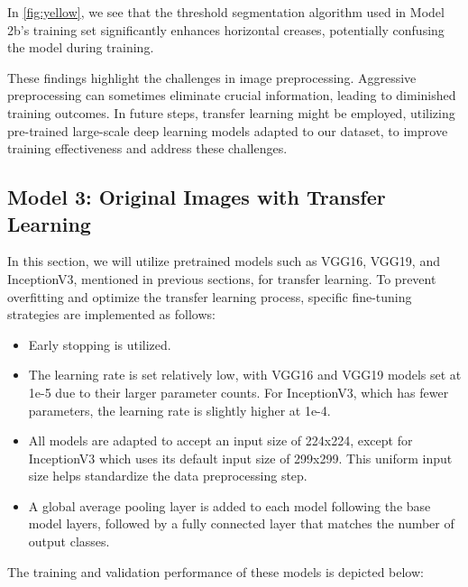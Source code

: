 In \autoref{fig:yellow}, we see that the threshold segmentation algorithm used in Model 2b’s training set significantly enhances horizontal creases, potentially confusing the model during training.

These findings highlight the challenges in image preprocessing. Aggressive preprocessing can sometimes eliminate crucial information, leading to diminished training outcomes. In future steps, transfer learning might be employed, utilizing pre-trained large-scale deep learning models adapted to our dataset, to improve training effectiveness and address these challenges.


\subsection{Model 3: Original Images with Transfer Learning}

In this section, we will utilize pretrained models such as VGG16, VGG19, and InceptionV3, mentioned in previous sections, for transfer learning. To prevent overfitting and optimize the transfer learning process, specific fine-tuning strategies are implemented as follows:

\begin{itemize}
    \item Early stopping is utilized.
    \item The learning rate is set relatively low, with VGG16 and VGG19 models set at 1e-5 due to their larger parameter counts. For InceptionV3, which has fewer parameters, the learning rate is slightly higher at 1e-4.
    \item All models are adapted to accept an input size of 224x224, except for InceptionV3 which uses its default input size of 299x299. This uniform input size helps standardize the data preprocessing step.
    \item A global average pooling layer is added to each model following the base model layers, followed by a fully connected layer that matches the number of output classes.
\end{itemize}


The training and validation performance of these models is depicted below:

